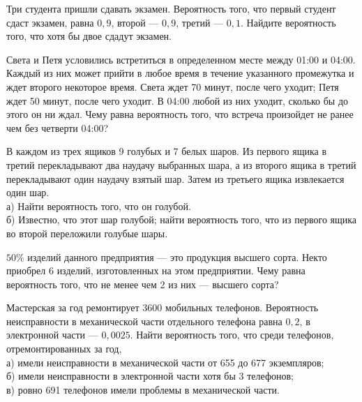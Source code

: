 \newpage\setcounter{zad}{0}



\begin{zkrW}{20}\noindent 
	Три студента пришли сдавать экзамен. Вероятность того, что первый студент сдаст экзамен, равна $0{,}9$, второй --- $0{,}9$, третий --- $0{,}1$. Найдите вероятность того, что хотя бы двое сдадут экзамен.
 
\end{zkrW}

\begin{zkrW}{20}\noindent 
	Света и Петя условились встретиться в определенном месте между 01:00 и 04:00. Каждый из них может прийти в любое время в течение указанного промежутка и ждет второго некоторое время. Света ждет 70 минут, после чего уходит; Петя ждет 50 минут, после чего уходит. В 04:00 любой из них уходит, сколько бы до этого он ни ждал. Чему равна вероятность того, что встреча произойдет не ранее чем без четверти 04:00?
 
\end{zkrW}

\begin{zkrW}{20}\noindent 
	В каждом из трех ящиков 9 голубых и 7 белых шаров. Из первого ящика в третий перекладывают два наудачу выбранных шара, а из второго ящика в третий перекладывают один наудачу взятый шар. Затем из третьего ящика извлекается один шар. \\ \indent а) Найти вероятность того, что он голубой. \\ \indent б) Известно, что этот шар голубой; найти вероятность того, что из первого ящика во второй переложили голубые шары.
 
\end{zkrW}

\begin{zkrW}{20}\noindent 
	$50\%$ изделий данного предприятия — это продукция высшего сорта. Некто приобрел 6 изделий, изготовленных на этом предприятии. Чему равна вероятность того, что не менее чем 2 из них — высшего сорта?
 
\end{zkrW}

\begin{zkrW}{20}\noindent 
	Мастерская за год ремонтирует 3600 мобильных телефонов. Вероятность неисправности в механической части отдельного телефона равна $0{,}2$, в электронной части --- $0{,}0025$. Найти вероятность того, что среди телефонов, отремонтированных за год, \\ \indent а) имели неисправности в механической части от 655 до 677 экземпляров; \\ \indent б) имели неисправности в электронной части хотя бы 3 телефонов; \\ \indent в) ровно 691 телефонов имели проблемы в механической части.
 
\end{zkrW}

